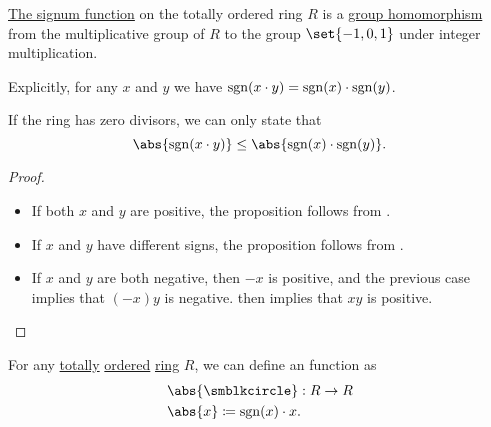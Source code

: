 \begin{proposition}\label{thm:def:totally_ordered_ring_signum}
  \hyperref[def:totally_ordered_ring_signum]{The signum function} on the totally ordered  ring \( R \) is a \hyperref[def:group/homomorphism]{group homomorphism} from the multiplicative group of \( R \) to the group \( \set{ -1, 0, 1 } \) under integer multiplication.

  Explicitly, for any \( x \) and \( y \) we have \( \operatorname{sgn}(x \cdot y) = \operatorname{sgn}(x) \cdot \operatorname{sgn}(y) \).

  If the ring has zero divisors, we can only state that
  \begin{equation*}
    \abs{\sgn(x \cdot y)} \leq \abs{\sgn(x) \cdot \sgn(y)}.
  \end{equation*}
\end{proposition}
\begin{proof}
  \hfill
  \begin{itemize}
    \item If both \( x \) and \( y \) are positive, the proposition follows from .
    \item If \( x \) and \( y \) have different signs, the proposition follows from .
    \item If \( x \) and \( y \) are both negative, then \( -x \) is positive, and the previous case implies that \( (-x)y \) is negative.  then implies that \( xy \) is positive.
  \end{itemize}
\end{proof}

\begin{definition}\label{def:totally_ordered_ring_absolute_value}\mimprovised
  For any \hyperref[def:totally_ordered_set]{totally} \hyperref[def:ordered_semiring]{ordered} \hyperref[def:ring]{ring} \( R \), we can define an  function as
  \begin{equation*}
    \begin{aligned}
      &\abs{\anon}: R \to R \\
      &\abs{x} \coloneqq \sgn(x) \cdot x.
    \end{aligned}
  \end{equation*}
\end{definition}

